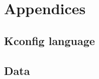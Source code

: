 \documentclass[a4paper,11pt]{report}
\begin{document}
\newpage



\newpage

\chapter{Appendices}
\section{Kconfig language}
\section{Data}
\end{document}
